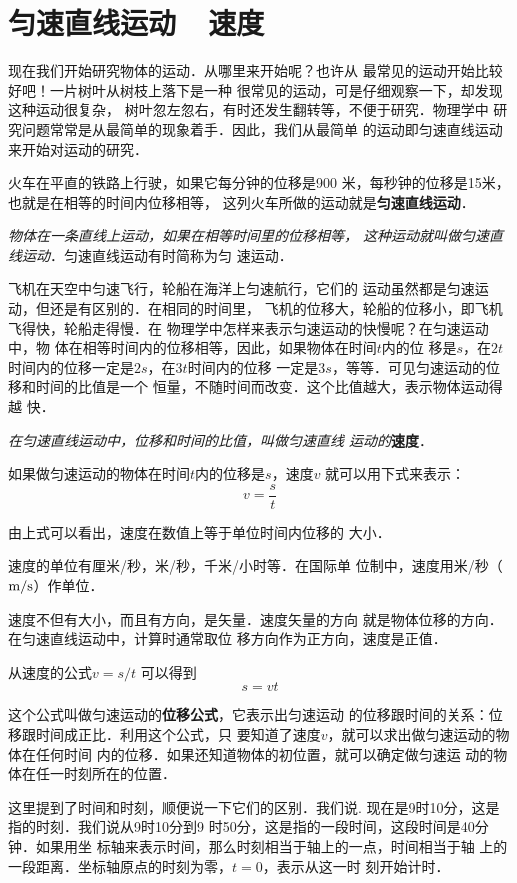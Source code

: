 \section{匀速直线运动~~速度}
    现在我们开始研究物体的运动．从哪里来开始呢？也许从
最常见的运动开始比较好吧！一片树叶从树枝上落下是一种
很常见的运动，可是仔细观察一下，却发现这种运动很复杂，
树叶忽左忽右，有时还发生翻转等，不便于研究．物理学中
研究问题常常是从最简单的现象着手．因此，我们从最简单
的运动即匀速直线运动来开始对运动的研究．

    火车在平直的铁路上行驶，如果它每分钟的位移是900
米，每秒钟的位移是15米，也就是在相等的时间内位移相等，
这列火车所做的运动就是\textbf{匀速直线运动}．

\textit{物体在一条直线上运动，如果在相等时间里的位移相等，
这种运动就叫做匀速直线运动}．匀速直线运动有时简称为匀
速运动．

    飞机在天空中匀速飞行，轮船在海洋上匀速航行，它们的
运动虽然都是匀速运动，但还是有区别的．在相同的时间里，
飞机的位移大，轮船的位移小，即飞机飞得快，轮船走得慢．在
物理学中怎样来表示匀速运动的快慢呢？在匀速运动中，物
体在相等时间内的位移相等，因此，如果物体在时间$t$内的位
移是$s$，在$2t$时间内的位移一定是$2s$，在$3t$时间内的位移
一定是$3s$，等等．可见匀速运动的位移和时间的比值是一个
恒量，不随时间而改变．这个比值越大，表示物体运动得越
快．

\textit{在匀速直线运动中，位移和时间的比值，叫做匀速直线
运动的}\textbf{速度}．

如果做匀速运动的物体在时间$t$内的位移是$s$，速度$v$
就可以用下式来表示：
\[v=\frac{s}{t} \]

由上式可以看出，速度在数值上等于单位时间内位移的
大小．

    速度的单位有厘米/秒，米/秒，千米/小时等．在国际单
位制中，速度用米/秒（$\text{m}/\text{s}$）作单位．

    速度不但有大小，而且有方向，是矢量．速度矢量的方向
就是物体位移的方向．在匀速直线运动中，计算时通常取位
移方向作为正方向，速度是正值．

从速度的公式$v=s/t$
可以得到
  \[s=vt \]

这个公式叫做匀速运动的\textbf{位移公式}，它表示出匀速运动
的位移跟时间的关系：位移跟时间成正比．利用这个公式，只
要知道了速度$v$，就可以求出做匀速运动的物体在任何时间
内的位移．如果还知道物体的初位置，就可以确定做匀速运
动的物体在任一时刻所在的位置．

这里提到了时间和时刻，顺便说一下它们的区别．我们说.
现在是9时10分，这是指的时刻．我们说从9时10分到9
时50分，这是指的一段时间，这段时间是40分钟．如果用坐
标轴来表示时间，那么时刻相当于轴上的一点，时间相当于轴
上的一段距离．坐标轴原点的时刻为零，$t=0$，表示从这一时
刻开始计时．

